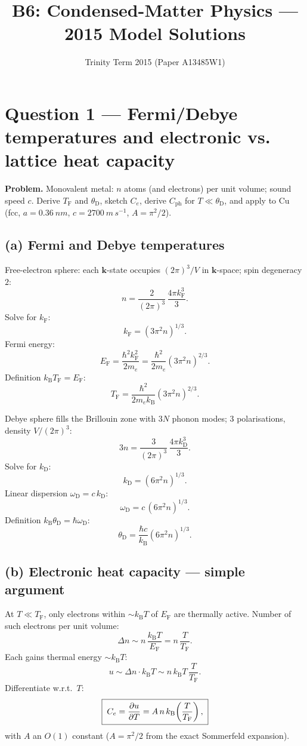 \documentclass[11pt]{article}
\title{B6: Condensed-Matter Physics --- 2015 Model Solutions}
\author{Trinity Term 2015 (Paper A13485W1)}
\date{}
\newcommand{\kB}{k_{\mathrm{B}}}
\newcommand{\TF}{T_{\mathrm{F}}}
\newcommand{\TD}{\theta_{\mathrm{D}}}
\newcommand{\EF}{E_{\mathrm{F}}}
\newcommand{\kF}{k_{\mathrm{F}}}
\newcommand{\kD}{k_{\mathrm{D}}}
\newcommand{\omD}{\omega_{\mathrm{D}}}
\begin{document}
\maketitle

\section*{Question 1 --- Fermi/Debye temperatures and electronic vs. lattice heat capacity}

\textbf{Problem.} Monovalent metal: $n$ atoms (and electrons) per unit volume; sound speed $c$. Derive $\TF$ and $\TD$, sketch $C_e$, derive $C_{\mathrm{ph}}$ for $T\ll\TD$, and apply to Cu (fcc, $a=\SI{0.36}{nm}$, $c=\SI{2700}{m\,s^{-1}}$, $A=\pi^2/2$).

\subsection*{(a) Fermi and Debye temperatures}

Free-electron sphere: each $\mathbf k$-state occupies $(2\pi)^3/V$ in $\mathbf k$-space; spin degeneracy $2$:
\[
n = \frac{2}{(2\pi)^{3}}\,\frac{4\pi \kF^{3}}{3}.
\]
Solve for $\kF$:
\[
\kF = (3\pi^{2} n)^{1/3}.
\]
Fermi energy:
\[
\EF = \frac{\hbar^{2}\kF^{2}}{2 m_{e}} = \frac{\hbar^{2}}{2 m_{e}}(3\pi^{2} n)^{2/3}.
\]
Definition $\kB \TF = \EF$:
\[
\boxed{\;\TF = \frac{\hbar^{2}}{2 m_{e}\kB}(3\pi^{2} n)^{2/3}.\;}
\]

Debye sphere fills the Brillouin zone with $3N$ phonon modes; $3$ polarisations, density $V/(2\pi)^{3}$:
\[
3 n = \frac{3}{(2\pi)^{3}}\,\frac{4\pi \kD^{3}}{3}.
\]
Solve for $\kD$:
\[
\kD = (6\pi^{2} n)^{1/3}.
\]
Linear dispersion $\omD = c\,\kD$:
\[
\omD = c\,(6\pi^{2} n)^{1/3}.
\]
Definition $\kB \TD = \hbar\omD$:
\[
\boxed{\;\TD = \frac{\hbar c}{\kB}(6\pi^{2} n)^{1/3}.\;}
\]

\subsection*{(b) Electronic heat capacity --- simple argument}

At $T\ll\TF$, only electrons within $\sim\kB T$ of $\EF$ are thermally active. Number of such electrons per unit volume:
\[
\Delta n \sim n\,\frac{\kB T}{\EF} = n\,\frac{T}{\TF}.
\]
Each gains thermal energy $\sim\kB T$:
\[
u \sim \Delta n\cdot \kB T \sim n\,\kB T\,\frac{T}{\TF}.
\]
Differentiate w.r.t.\ $T$:
\[
\boxed{\;C_{e} = \pdv{u}{T} = A\,n\,\kB\!\left(\frac{T}{\TF}\right),\;}
\]
with $A$ an $O(1)$ constant ($A=\pi^{2}/2$ from the exact Sommerfeld expansion).
\end{document}
